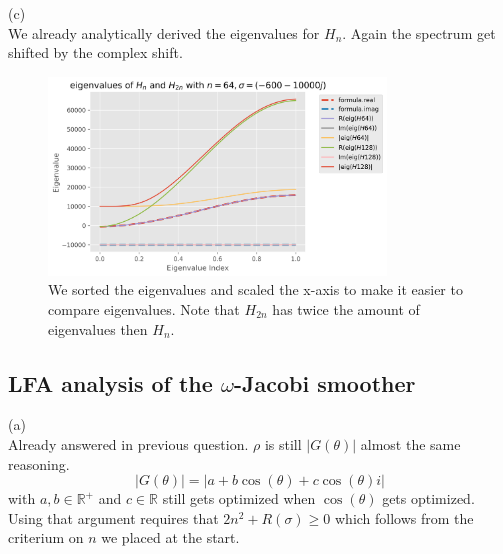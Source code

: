 \documentclass[a4paper,12pt]{article}
\begin{document}
(c) \\
We already analytically derived the eigenvalues for $H_{n}$. Again the spectrum get shifted by the complex shift.

\begin{figure}[h!]
    \centering
    \includegraphics[width=0.8\textwidth]{../code/plts/eigenvalues_1Dcomplex.png}
    \caption{We sorted the eigenvalues and scaled the x-axis to make it easier to compare eigenvalues.
        Note that $H_{2n}$ has twice the amount of eigenvalues then $H_{n}$.}
    \label{fig: eigen complex 1D}
\end{figure}


\subsection{LFA analysis of the $\omega$-Jacobi smoother}
(a) \\
Already answered in previous question. $\rho$ is still $|G(\theta)|$ almost the same reasoning.
\begin{equation}
    |G(\theta)| = |a + b \cos(\theta) + c \cos(\theta)i|
\end{equation}
with $a,b \in \mathbb{R}^{+}$ and $c \in  \mathbb{R}$ still gets optimized when $\cos\left(\theta\right)$
gets optimized. Using that argument requires that $2n^{2}+R(\sigma)\geq 0$ which follows from the criterium on
$n$ we placed at the start.
\end{document}
